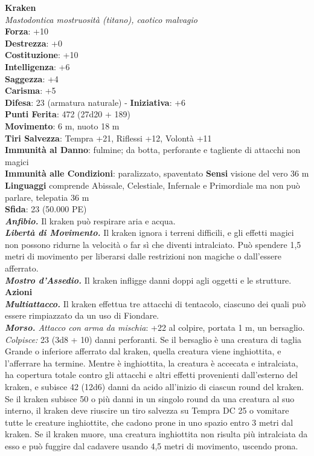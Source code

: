 \begin{multicols}{2}
\medskip\textbf{Kraken}\\
\emph{Mastodontica mostruosità (titano), caotico malvagio}\\
\textbf{Forza}: +10\\
\textbf{Destrezza}: +0\\
\textbf{Costituzione}: +10\\
\textbf{Intelligenza}: +6\\
\textbf{Saggezza}: +4\\
\textbf{Carisma}: +5\\
\textbf{Difesa}: 23 (armatura naturale) - \textbf{Iniziativa}: +6\\
\textbf{Punti Ferita}: 472 (27d20 + 189) \\
\textbf{Movimento}: 6 m, nuoto 18 m\\
\textbf{Tiri Salvezza}: Tempra +21, Riflessi +12, Volontà +11\\
\textbf{Immunità al Danno}: fulmine; da botta, perforante e tagliente di attacchi non magici\\
\textbf{Immunità alle Condizioni}: paralizzato, spaventato
\textbf{Sensi} visione del vero 36 m\\
\textbf{Linguaggi} comprende Abissale, Celestiale, Infernale e Primordiale ma non può parlare, telepatia 36 m \\
\textbf{Sfida}: 23 (50.000 PE)\smallskip\\
\emph{\textbf{Anfibio.}} Il kraken può respirare aria e acqua.\\
\emph{\textbf{Libertà di Movimento.}} Il kraken ignora i terreni difficili, e gli effetti magici non possono ridurne la velocità o far sì che diventi intralciato. Può spendere 1,5 metri di movimento per liberarsi dalle restrizioni non magiche o dall'essere afferrato.\\
\emph{\textbf{Mostro d'Assedio.}} Il kraken infligge danni doppi agli oggetti e le strutture.\\
\smallskip\textbf{Azioni}\\
\emph{\textbf{Multiattacco.}} Il kraken effettua tre attacchi di tentacolo, ciascuno dei quali può essere rimpiazzato da un uso di Fiondare.\\
\emph{\textbf{Morso.} Attacco con arma da mischia}: +22 al colpire, portata 1 m, un bersaglio.\\
\emph{Colpisce:} 23 (3d8 + 10) danni perforanti. Se il bersaglio è una creatura di taglia Grande o inferiore afferrato dal kraken, quella creatura viene inghiottita, e l'afferrare ha termine. Mentre è inghiottita, la creatura è accecata e intralciata, ha copertura totale contro gli attacchi e altri effetti provenienti dall'esterno del kraken, e subisce 42 (12d6) danni da acido all'inizio di ciascun round del kraken.\\
Se il kraken subisce 50 o più danni in un singolo round da una creatura al suo interno, il kraken deve riuscire un tiro salvezza su Tempra DC 25 o vomitare tutte le creature inghiottite, che cadono prone in uno spazio entro 3 metri dal kraken. Se il kraken muore, una creatura inghiottita non risulta più intralciata da esso e può fuggire dal cadavere usando 4,5 metri di movimento, uscendo prona.\\


\end{multicols}
